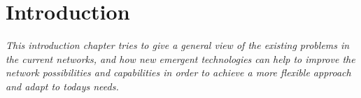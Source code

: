 \chapter{Introduction}
\label{ch:introduction}

\textit{This introduction chapter tries to give a general view of the existing problems in the current networks, and how new emergent technologies can help to improve the network possibilities and capabilities in order to achieve a more flexible approach and adapt to todays needs.}







